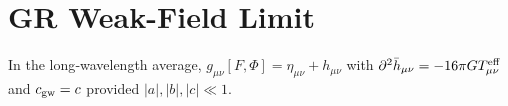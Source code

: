 \section*{GR Weak-Field Limit} In the long‑wavelength average, $g_{\mu\nu}[F,\Phi]=\eta_{\mu\nu}+h_{\mu\nu}$ with $\partial^2 \bar h_{\mu\nu}= -16\pi G T^{\rm eff}_{\mu\nu}$ and $c_{\rm gw}=c$ provided $|a|,|b|,|c|\ll 1$.
